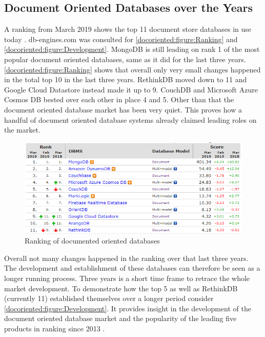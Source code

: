 \subsection{Document Oriented Databases over the Years}
A ranking from March 2019 shows the top 11 document store databases in use today \parencite{dbEngineRankingPopularity}. db-engines.com was consulted for \autoref{docoriented:figure:Ranking} and \autoref{docoriented:figure:Development}. MongoDB is still leading on rank 1 of the most popular document oriented databases, same as it did for the last three years. \autoref{docoriented:figure:Ranking} shows that overall only very small changes happened in the total top 10 in the last three years. RethinkDB moved down to 11 and Google Cloud Datastore instead made it up to 9. CouchDB and Microsoft Azure Cosmos DB bested over each other in place 4 and 5. Other than that the document oriented database market has been very quiet. This proves how a handful of document oriented database systems already claimed leading roles on the market.
\begin{figure}
    \includegraphics[width=\textwidth]{img/dbRanked.png}
    \caption{Ranking of documented oriented databases}
    \label{docoriented:figure:Ranking}
\end{figure}
Overall not many changes happened in the ranking over that last three years. The development and establishment of these databases can therefore be seen as a longer running process. Three years is a short time frame to retrace the whole market development. To demonstrate how the top 5 as well as RethinkDB (currently 11) established themselves over a longer period consider \autoref{docoriented:figure:Development}. It provides insight in the development of the document oriented database market and the popularity of the leading five products in ranking since 2013 \parencite{dbEngineRankingPopularity}. 

